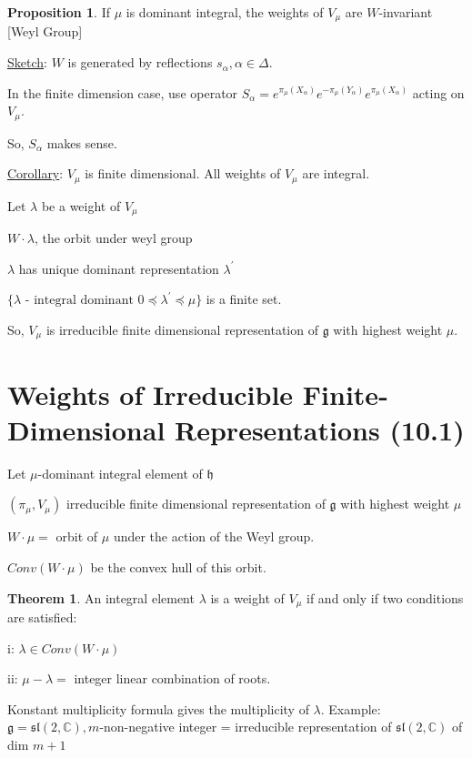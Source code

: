 \documentclass{article}
\theoremstyle{definition}
\newtheorem{theorem}{Theorem}
\newtheorem{proposition}{Proposition}
\begin{document}
\begin{proposition}
    If \(\mu\) is dominant integral, the weights of \(V_\mu\) are \(W\)-invariant [Weyl Group]
\end{proposition}

\underline{Sketch}: \(W\) is generated by reflections \(s_\alpha, \alpha \in \Delta\).

In the finite dimension case, use operator \(S_\alpha=e^{\pi_\mu(X_\alpha)}e^{-\pi_\mu(Y_\alpha)}e^{\pi_\mu(X_\alpha)}\) acting on \(V_\mu\).

So, \(S_\alpha\) makes sense.

\underline{Corollary}: \(V_\mu\) is finite dimensional. All weights of \(V_\mu\) are integral. 

Let \(\lambda\) be a weight of \(V_\mu\)

\(W\cdot \lambda\), the orbit under weyl group

\(\lambda\) has unique dominant representation \(\lambda ^{\prime}\)

\(\{ \lambda \text{ - integral dominant } 0 \preceq \lambda^{\prime}  \preceq \mu\}\) is a finite set.

So, \(V_\mu\) is irreducible finite dimensional representation of \(\mathfrak{g}\) with highest weight \(\mu\).

\section*{Weights of Irreducible Finite-Dimensional Representations (10.1)}

Let \(\mu\)-dominant integral element of \(\mathfrak{h}\)

\((\pi_\mu,V_\mu)\) irreducible finite dimensional representation of \(\mathfrak{g}\) with highest weight \(\mu\)

\(W\cdot\mu = \) orbit of \(\mu\) under the action of the Weyl group.

\(Conv(W\cdot \mu)\) be the convex hull of this orbit.

\begin{theorem}
    An integral element \(\lambda\) is a weight of \(V_\mu\) if and only if two conditions are satisfied:
    
    i: \(\lambda \in Conv(W\cdot\mu)\)
    
    ii: \(\mu -\lambda =\) integer linear combination of roots.
\end{theorem}

Konstant multiplicity formula gives the multiplicity of \(\lambda\). Example: \(\mathfrak{g} = \mathfrak{sl}(2,\mathbb{C}), m\)-non-negative integer = irreducible representation of \(\mathfrak{sl} (2,\mathbb{C})\) of dim \(m+1\)    
\end{document}
